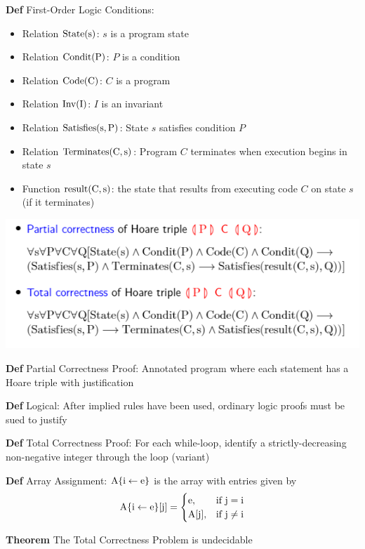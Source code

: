 \documentclass[11pt,notitlepage]{report}
\newcommand{\tbf}[1]{\textbf{#1}}
\begin{document}
\tbf{Def} First-Order Logic Conditions:
\vspace{-3mm}
\begin{itemize}
    \item Relation $\rm State(s)$: $s$ is a program state
    \item Relation $\rm Condit(P)$: $P$ is a condition
    \item Relation $\rm Code(C)$: $C$ is a program
    \item Relation $\rm Inv(I)$: $I$ is an invariant
    \item Relation $\rm Satisfies(s, P)$: State $s$ satisfies condition $P$
    \item Relation $\rm Terminates(C, s)$: Program $C$ terminates when execution begins in state $s$
    \item Function $\rm result(C, s)$: the state that results from executing code $C$ on state $s$ (if it terminates)
\end{itemize}
\vspace{-3mm}
\begin{center}
    \includegraphics[width=.9\textwidth]{hoare.png}
\end{center}

\tbf{Def} Partial Correctness Proof: Annotated program where each statement has a Hoare triple with justification

\tbf{Def} Logical: After implied rules have been used, ordinary logic proofs must be sued to justify

\tbf{Def} Total Correctness Proof: For each while-loop, identify a strictly-decreasing non-negative integer through the loop (variant)

\tbf{Def} Array Assignment: $\rm A\{i \leftarrow e\}$ is the array with entries given by
$$\rm A\{i \leftarrow e\}[j]  =\begin{cases}\rm e, &\text{if }\rm j=i\\\rm A[j], &\text{if }\rm j\ne i\end{cases}$$

\tbf{Theorem} The Total Correctness Problem is undecidable
\end{document}
